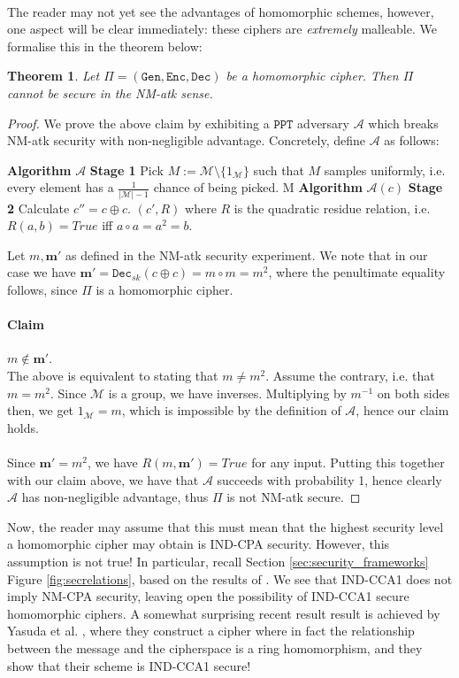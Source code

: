 \documentclass{article}
\newtheorem{theorem}{Theorem}[section]
\theoremstyle{definition}
\theoremstyle{example}
\newcommand{\Enc}{\texttt{Enc}}
\newcommand{\Dec}{\texttt{Dec}}
\newcommand{\Gen}{\texttt{Gen}}
\newcommand{\M}{\mathcal{M}}
\newcommand{\A}{\mathcal{A}}
\newcommand{\PPT}{\texttt{PPT}}
\begin{document}
\paragraph{} The reader may not yet see the advantages of homomorphic schemes,
however, one aspect will be clear immediately: these ciphers are
\textit{extremely} malleable. We formalise this in the theorem below:
\begin{theorem}
  Let $\Pi = (\Gen, \Enc, \Dec)$ be a homomorphic cipher. Then $\Pi$ cannot be
  secure in the NM-atk sense. 
\end{theorem}
\begin{proof}
  We prove the above claim by exhibiting a $\PPT$ adversary $\A$ which breaks
  NM-atk security with non-negligible advantage. Concretely, define $\A$ as
  follows:
  \begin{algorithmic}
    \State \textbf{Algorithm} $\A$ \textbf{Stage 1}
    \State Pick $M := \M \setminus \{1_\M\}$ such that $M$ samples uniformly,
    i.e. every element has a $\frac1{|\M| - 1}$ chance of being picked.
    \State \Return M
    \State
    \State \textbf{Algorithm} $\A(c)$ \textbf{Stage 2}
    \State Calculate $c'' = c \oplus c$.
    \State \Return $(c', R)$ where $R$ is the quadratic residue relation, i.e. $R(a,
    b) = True$ iff $a \circ a = a^2 = b$.
    \State
  \end{algorithmic}
  Let $m, \textbf{m}'$ as defined in the NM-atk security experiment. We note
  that in our case we have $\textbf{m}' = \Dec_{sk}(c \oplus c) = m \circ m =
  m^2$, where the penultimate equality follows, since $\Pi$ is a homomorphic cipher. 
  \paragraph{Claim} $m \not\in \textbf{m}'$. \\
  The above is equivalent to stating that $m \neq m^2$. Assume the contrary,
  i.e. that $m = m^2$. Since $\M$ is a group, we have inverses. Multiplying by
  $m^{-1}$ on both sides then, we get $1_\M = m$, which is impossible by the
  definition of $\A$, hence our claim holds.
  \paragraph{}
  Since $\textbf{m}' = m^2$, we have $R(m, \textbf{m}') = True$ for any input.
  Putting this together with our claim above, we have that $\A$ succeeds with
  probability 1, hence clearly $\A$ has non-negligible advantage, thus $\Pi$
  is not NM-atk secure.
\end{proof}
Now, the reader may assume that this must mean that the highest security level a
homomorphic cipher may obtain is IND-CPA security. However, this assumption is
not true! In particular, recall Section \ref{sec:security_frameworks} Figure
\ref{fig:secrelations}, based on the results of \cite{bellaresecurityrelations}.
We see that IND-CCA1 does not imply NM-CPA security, leaving open the
possibility of IND-CCA1 secure homomorphic ciphers. A somewhat surprising recent
result result is achieved by Yasuda et al. \cite{Yasuda2018}, where they construct a
cipher where in fact the relationship between the message and the cipherspace is
a ring homomorphism, and they show that their scheme is IND-CCA1 secure!
\end{document}
